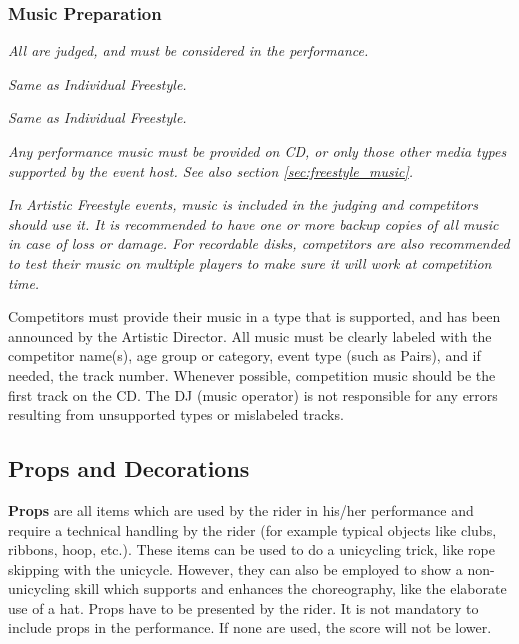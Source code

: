 \subsubsection{Music Preparation}
\textit{All are judged, and must be considered in the performance.}

\textit{Same as Individual Freestyle.}

\textit{Same as Individual Freestyle.}

\textit{Any performance music must be provided on CD, or only those other media types supported by the event host.
See also section \ref{sec:freestyle_music}.}

\label{sec:freestyle_music} %
\textit{In Artistic Freestyle events, music is included in the judging and competitors should use it.
It is recommended to have one or more backup copies of all music in case of loss or damage.
For recordable disks, competitors are also recommended to test their music on multiple players to make sure it will work at competition time.}

Competitors must provide their music in a type that is supported, and has been announced by the Artistic Director.
All music must be clearly labeled with the competitor name(s), age group or category, event type (such as Pairs), and if needed, the track number.
Whenever possible, competition music should be the first track on the CD.
The DJ (music operator) is not responsible for any errors resulting from unsupported types or mislabeled tracks.

\subsection{Props and Decorations \label{subsec:freestyle_freestyle-rules_individual-freestyle-overview_props-and-decorations}}

\textbf{Props} are all items which are used by the rider in his/her performance and require a technical handling by the rider (for example typical objects like clubs, ribbons, hoop, etc.). 
These items can be used to do a unicycling trick, like rope skipping with the unicycle.
However, they can also be employed to show a non-unicycling skill which supports and enhances the choreography, like the elaborate use of a hat.
Props have to be presented by the rider.
It is not mandatory to include props in the performance.
If none are used, the score will not be lower. 

